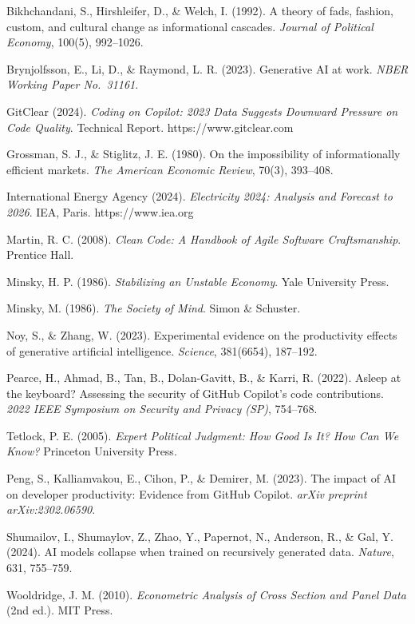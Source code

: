 \documentclass[11pt,a4paper]{article}
\begin{document}
Bikhchandani, S., Hirshleifer, D., \& Welch, I. (1992). A theory of fads, fashion, custom, and cultural change as informational cascades. \emph{Journal of Political Economy}, 100(5), 992--1026.

Brynjolfsson, E., Li, D., \& Raymond, L. R. (2023). Generative AI at work. \emph{NBER Working Paper No.~31161}.

GitClear (2024). \emph{Coding on Copilot: 2023 Data Suggests Downward Pressure on Code Quality}. Technical Report. https://www.gitclear.com

Grossman, S. J., \& Stiglitz, J. E. (1980). On the impossibility of informationally efficient markets. \emph{The American Economic Review}, 70(3), 393--408.

International Energy Agency (2024). \emph{Electricity 2024: Analysis and Forecast to 2026}. IEA, Paris. https://www.iea.org

Martin, R. C. (2008). \emph{Clean Code: A Handbook of Agile Software Craftsmanship}. Prentice Hall.

Minsky, H. P. (1986). \emph{Stabilizing an Unstable Economy}. Yale University Press.

Minsky, M. (1986). \emph{The Society of Mind}. Simon \& Schuster.

Noy, S., \& Zhang, W. (2023). Experimental evidence on the productivity effects of generative artificial intelligence. \emph{Science}, 381(6654), 187--192.

Pearce, H., Ahmad, B., Tan, B., Dolan-Gavitt, B., \& Karri, R. (2022). Asleep at the keyboard? Assessing the security of GitHub Copilot's code contributions. \emph{2022 IEEE Symposium on Security and Privacy (SP)}, 754--768.

Tetlock, P. E. (2005). \emph{Expert Political Judgment: How Good Is It? How Can We Know?} Princeton University Press.

Peng, S., Kalliamvakou, E., Cihon, P., \& Demirer, M. (2023). The impact of AI on developer productivity: Evidence from GitHub Copilot. \emph{arXiv preprint arXiv:2302.06590}.

Shumailov, I., Shumaylov, Z., Zhao, Y., Papernot, N., Anderson, R., \& Gal, Y. (2024). AI models collapse when trained on recursively generated data. \emph{Nature}, 631, 755--759.

Wooldridge, J. M. (2010). \emph{Econometric Analysis of Cross Section and Panel Data} (2nd ed.). MIT Press.
\end{document}
